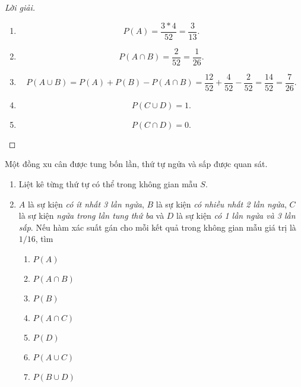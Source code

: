 \documentclass[class=probandstats,crop=false]{standalone}
\begin{document}
\begin{proof}[Lời giải]
    \begin{enumerate}[label = \textbf{(\alph*)}]
        \item
              \[
                  P(A) = \dfrac{3 * 4}{52} = \dfrac{3}{13}.
              \]
        \item
              \[
                  P(A\cap B) = \dfrac{2}{52} = \dfrac{1}{26}.
              \]
        \item
              \[
                  P(A\cup B) = P(A) + P(B) - P(A\cap B) = \dfrac{12}{52} + \dfrac{4}{52} - \dfrac{2}{52} = \dfrac{14}{52} = \dfrac{7}{26}.
              \]
        \item
              \[
                  P(C\cup D) = 1.
              \]
        \item
              \[
                  P(C\cap D) = 0.
              \]
    \end{enumerate}
\end{proof}

\begin{exercise}
    \par Một đồng xu cân được tung bốn lần, thứ tự ngửa và sấp được quan sát.
    \begin{enumerate}[label = \textbf{(\alph*)}]
        \item Liệt kê từng thứ tự có thể trong không gian mẫu $S$.
        \item $A$ là sự kiện \textit{có ít nhất 3 lần ngửa}, $B$ là sự kiện \textit{có nhiều nhất 2 lần ngửa}, $C$ là sự kiện \textit{ngửa trong lần tung thứ ba} và $D$ là sự kiện \textit{có 1 lần ngửa và 3 lần sấp}. Nếu hàm xác suất gán cho mỗi kết quả trong không gian mẫu giá trị là $1/16$, tìm
              \begin{enumerate}[label = \textbf{(\arabic*)}]
                  \item $P(A)$
                  \item $P(A\cap B)$
                  \item $P(B)$
                  \item $P(A\cap C)$
                  \item $P(D)$
                  \item $P(A\cup C)$
                  \item $P(B\cup D)$
              \end{enumerate}
    \end{enumerate}
\end{exercise}
\end{document}
